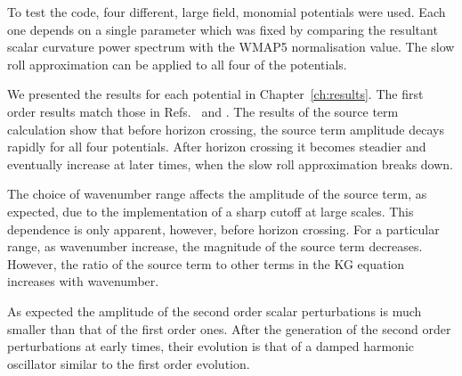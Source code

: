 To test the code, four different, large field, monomial potentials were used. Each
one depends on a single parameter which was fixed by comparing the resultant scalar
curvature power spectrum with the WMAP5 normalisation value. The slow roll
approximation can be applied to all four of the potentials.

We presented the results for each potential in Chapter~\ref{ch:results}. The first
order results match those in Refs.~\cite{Martin:2006rs, Ringeval:2007am} and
\cite{Salopek:1988qh}. The results of the source term calculation show that before
horizon crossing, the source term amplitude decays rapidly for all four potentials.
After horizon crossing it becomes steadier and eventually increase at later times,
when the slow roll approximation breaks down.

The choice of wavenumber range affects the amplitude of the source term, as
expected, due to the implementation of a sharp cutoff at large scales. This
dependence is only apparent, however, before horizon crossing. For a particular
range, as wavenumber increase, the magnitude of the source term decreases. However,
the ratio of the source term to other terms in the KG equation increases with
wavenumber. 

As expected the amplitude of the second order scalar perturbations is much smaller
than that of the first order ones. After the generation of the second order
perturbations at early times, their evolution is that of a damped harmonic
oscillator similar to the first order evolution.
